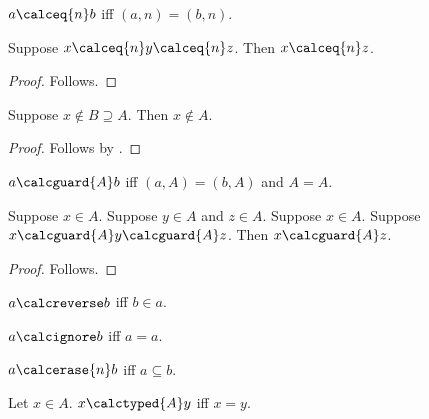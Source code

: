 

\begin{abbreviation}\label{calculation_parameterized_equality}
    $a\calceq{n}b$ iff $(a,n)=(b,n)$.
\end{abbreviation}

\begin{composition}\label{calculation_parameterized_composition}
    Suppose $x\calceq{n}y\calceq{n}z$.
    Then $x\calceq{n}z$.
\end{composition}
\begin{proof}
    Follows.
\end{proof}

\begin{composition}\label{calculation_negative_membership}
    Suppose $x\notin B\supseteq A$.
    Then $x\notin A$.
\end{composition}
\begin{proof}
    Follows by .
\end{proof}

\begin{abbreviation}\label{calculation_guarded_equality}
    $a\calcguard{A}b$ iff $(a,A)=(b,A)$ and $A=A$.
\end{abbreviation}

\begin{composition}\label{calculation_several_conditions}
    Suppose $x\in A$.
    Suppose $y\in A$ and $z\in A$.
    Suppose $x\in A$.
    Suppose $x\calcguard{A}y\calcguard{A}z$.
    Then $x\calcguard{A}z$.
\end{composition}
\begin{proof}
    Follows.
\end{proof}

\begin{abbreviation}\label{calculation_reversed_membership}
    $a\calcreverse b$ iff $b\in a$.
\end{abbreviation}

\begin{abbreviation}\label{calculation_ignored_endpoint}
    $a\calcignore b$ iff $a=a$.
\end{abbreviation}

\begin{abbreviation}\label{calculation_erased_parameter}
    $a\calcerase{n}b$ iff $a\subseteq b$.
\end{abbreviation}

\begin{definition}\label{calculation_typed_relation}
    Let $x\in A$.
    $x\calctyped{A}y$ iff $x=y$.
\end{definition}
